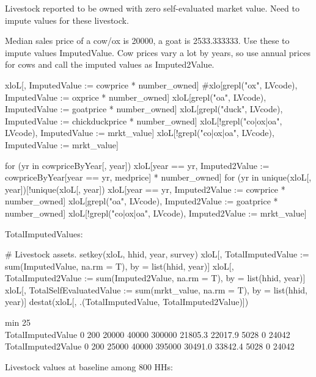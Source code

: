 Livestock reported to be owned with zero self-evaluated market value. Need to impute values for these livestock. \gobblepars

Median sales price of a cow/ox is 20000, %
a goat is 2533.333333. Use these to impute values \textsf{ImputedValue}. Cow prices vary a lot by years, so use annual prices for cows and call the imputed values as \textsf{Imputed2Value}.
\begin{Schunk}
\begin{Sinput}
xloL[, ImputedValue := cowprice * number_owned]
#xlo[grepl("ox", LVcode), ImputedValue := oxprice * number_owned]
xloL[grepl("oa", LVcode), ImputedValue := goatprice * number_owned]
xloL[grepl("duck", LVcode), ImputedValue := chickduckprice * number_owned]
xloL[!grepl("co|ox|oa", LVcode), ImputedValue := mrkt_value]
xloL[!grepl("co|ox|oa", LVcode), ImputedValue := mrkt_value]

for (yr in cowpriceByYear[, year]) 
  xloL[year == yr, Imputed2Value := cowpriceByYear[year == yr, medprice] * number_owned]
for (yr in unique(xloL[, year])[!unique(xloL[, year]) %in% cowpriceByYear[, year]]) 
  xloL[year == yr, Imputed2Value := cowprice * number_owned]
xloL[grepl("oa", LVcode), Imputed2Value := goatprice * number_owned]
xloL[!grepl("co|ox|oa", LVcode), Imputed2Value := mrkt_value]
\end{Sinput}
\end{Schunk}
\textsf{TotalImputedValues}:
\begin{Schunk}
\begin{Sinput}
# Livestock assets.
setkey(xloL, hhid, year, survey)
xloL[, TotalImputedValue := sum(ImputedValue, na.rm = T), by = list(hhid, year)]
xloL[, TotalImputed2Value := sum(Imputed2Value, na.rm = T), by = list(hhid, year)]
xloL[, TotalSelfEvaluatedValue := sum(mrkt_value, na.rm = T), by = list(hhid, year)]
destat(xloL[, .(TotalImputedValue, TotalImputed2Value)])
\end{Sinput}
\begin{Soutput}
                   min 25\\% median 75\\%    max    mean     std   0s NAs     n
TotalImputedValue    0   200  20000 40000 300000 21805.3 22017.9 5028   0 24042
TotalImputed2Value   0   200  25000 40000 395000 30491.0 33842.4 5028   0 24042
\end{Soutput}
\end{Schunk}
Livestock values at baseline among 800 HHs:
